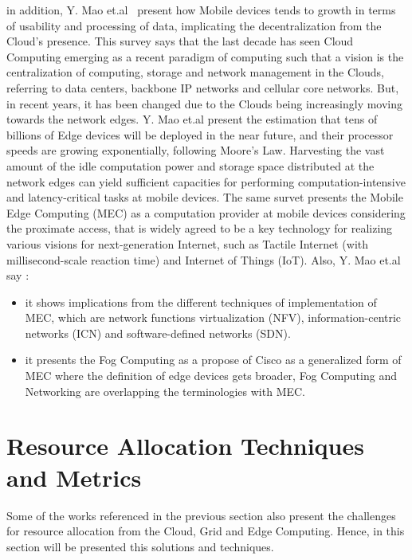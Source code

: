 in addition, Y. {Mao} et.al~\cite{survey_mec} present how Mobile devices tends to growth in terms of usability and processing of data, implicating the decentralization from the Cloud's presence. This survey says that the last decade has seen Cloud Computing emerging as a recent paradigm of computing such that a vision is the centralization of computing, storage and network management in the Clouds, referring to data centers, backbone IP networks and cellular core networks. But, in recent years, it has been changed due to the Clouds being increasingly moving towards the network edges. 
Y. {Mao} et.al present the estimation that tens of billions of Edge devices will be deployed in the near future, and their processor speeds are growing exponentially, following Moore’s Law. Harvesting the vast amount of the idle computation power and storage space distributed at the network edges can yield sufficient capacities for performing computation-intensive and latency-critical tasks at mobile devices. 
The same survet presents the Mobile Edge Computing (MEC) as a computation provider at mobile devices considering the proximate access, that is widely agreed to be a key technology for realizing various visions for next-generation Internet, such as Tactile Internet (with millisecond-scale reaction time) and Internet of Things (IoT). Also, Y. {Mao} et.al say : 
\begin{itemize}
    
    \item it shows implications from the different techniques of implementation of MEC, which are network functions virtualization (NFV), information-centric networks (ICN) and software-defined networks (SDN).
    
    \item it presents the Fog Computing as a propose of Cisco as a generalized form of MEC where the definition of edge devices gets broader, Fog Computing and Networking are overlapping the terminologies with MEC.
    
\end{itemize}

\section{Resource Allocation Techniques and Metrics}

Some of the works referenced in the previous section also present the challenges for resource allocation from the Cloud, Grid and Edge Computing. Hence, in this section will be presented this solutions and techniques.

